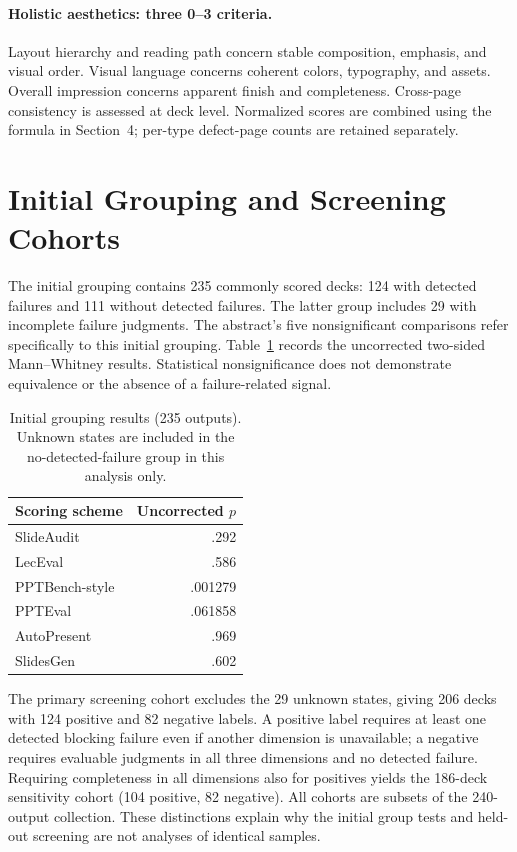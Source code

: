 \paragraph{Holistic aesthetics: three 0--3 criteria.}
Layout hierarchy and reading path concern stable composition, emphasis, and visual order. Visual language concerns coherent colors, typography, and assets. Overall impression concerns apparent finish and completeness. Cross-page consistency is assessed at deck level. Normalized scores are combined using the formula in Section~4; per-type defect-page counts are retained separately.

\section{Initial Grouping and Screening Cohorts}
\label{app:groups}
The initial grouping contains 235 commonly scored decks: 124 with detected failures and 111 without detected failures. The latter group includes 29 with incomplete failure judgments. The abstract's five nonsignificant comparisons refer specifically to this initial grouping. Table~\ref{tab:initial} records the uncorrected two-sided Mann--Whitney results. Statistical nonsignificance does not demonstrate equivalence or the absence of a failure-related signal.

\begin{table}[h]
\caption{Initial grouping results (235 outputs). Unknown states are included in the no-detected-failure group in this analysis only.}
\label{tab:initial}\centering\small
\begin{tabular}{@{}lr@{}}
\toprule Scoring scheme & Uncorrected $p$\\\midrule
SlideAudit & .292\\
LecEval & .586\\
PPTBench-style & .001279\\
PPTEval & .061858\\
AutoPresent & .969\\
SlidesGen & .602\\\bottomrule
\end{tabular}
\end{table}

The primary screening cohort excludes the 29 unknown states, giving 206 decks with 124 positive and 82 negative labels. A positive label requires at least one detected blocking failure even if another dimension is unavailable; a negative requires evaluable judgments in all three dimensions and no detected failure. Requiring completeness in all dimensions also for positives yields the 186-deck sensitivity cohort (104 positive, 82 negative). All cohorts are subsets of the 240-output collection. These distinctions explain why the initial group tests and held-out screening are not analyses of identical samples.

